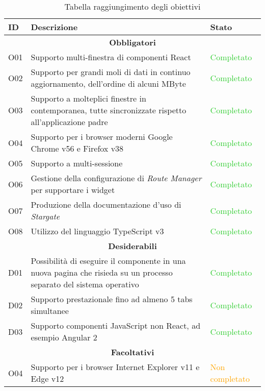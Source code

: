 \begin{table}[H]
\small
\begin{tabular}{ |p{1cm} |p{9cm}| p{2cm}|}
\hline
\textbf{ID} & \textbf{Descrizione} & \textbf{Stato} \\ \hline

\multicolumn{3}{|c|}{\textbf{Obbligatori}} \\ \hline

O01 & Supporto multi-finestra di componenti React & \textcolor{LimeGreen}{Completato} \\ \hline
O02 & Supporto per grandi moli di dati in continuo aggiornamento, dell'ordine di alcuni MByte & \textcolor{LimeGreen}{Completato} \\ \hline
O03 & Supporto a molteplici finestre in contemporanea, tutte sincronizzate rispetto all'applicazione padre & \textcolor{LimeGreen}{Completato} \\ \hline
O04 & Supporto per i browser moderni Google Chrome v56 e Firefox v38 & \textcolor{LimeGreen}{Completato} \\ \hline
O05 & Supporto a multi-sessione & \textcolor{LimeGreen}{Completato} \\ \hline
O06 & Gestione della configurazione di \textit{Route Manager} per supportare i widget & \textcolor{LimeGreen}{Completato} \\ \hline
O07 & Produzione della documentazione d'uso di \textit{Stargate} & \textcolor{LimeGreen}{Completato} \\ \hline
O08 & Utilizzo del linguaggio TypeScript v3 & \textcolor{LimeGreen}{Completato} \\ \hline

\multicolumn{3}{|c|}{\textbf{Desiderabili}} \\ \hline

D01 & Possibilità di eseguire il componente in una nuova pagina che risieda su un processo separato del sistema operativo & \textcolor{LimeGreen}{Completato} \\ \hline
D02 & Supporto prestazionale fino ad almeno 5 tabs simultanee & \textcolor{LimeGreen}{Completato} \\ \hline
D03 & Supporto componenti JavaScript non React, ad esempio Angular 2 & \textcolor{LimeGreen}{Completato} \\ \hline

\multicolumn{3}{|c|}{\textbf{Facoltativi}} \\ \hline

O04 & Supporto per i browser Internet Explorer v11 e Edge v12 & \textcolor{Orange}{Non completato} \\ \hline

\end{tabular}
\caption{Tabella raggiungimento degli obiettivi}
\end{table}

